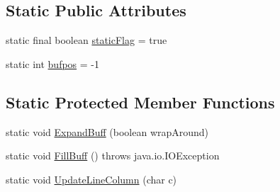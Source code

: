 \subsection*{Static Public Attributes}
\begin{DoxyCompactItemize}
\item 
static final boolean \mbox{\hyperlink{classorg_1_1tec_1_1comp_1_1interpreter_1_1_simple_char_stream_ae21599dc553d1b20e7aa93cd3a4ac484}{static\+Flag}} = true
\item 
static int \mbox{\hyperlink{classorg_1_1tec_1_1comp_1_1interpreter_1_1_simple_char_stream_a97402438cef8beceb46a3310b396295c}{bufpos}} = -\/1
\end{DoxyCompactItemize}
\subsection*{Static Protected Member Functions}
\begin{DoxyCompactItemize}
\item 
static void \mbox{\hyperlink{classorg_1_1tec_1_1comp_1_1interpreter_1_1_simple_char_stream_ac4c8438cb78abd55d3c736c23d6aa85d}{Expand\+Buff}} (boolean wrap\+Around)
\item 
static void \mbox{\hyperlink{classorg_1_1tec_1_1comp_1_1interpreter_1_1_simple_char_stream_aa2c2b4b13b57c50ef4caaf2dedc1ccbd}{Fill\+Buff}} ()  throws java.\+io.\+I\+O\+Exception   
\item 
static void \mbox{\hyperlink{classorg_1_1tec_1_1comp_1_1interpreter_1_1_simple_char_stream_a521997f2f7bb8858b3ce6296862e814d}{Update\+Line\+Column}} (char c)
\end{DoxyCompactItemize}
